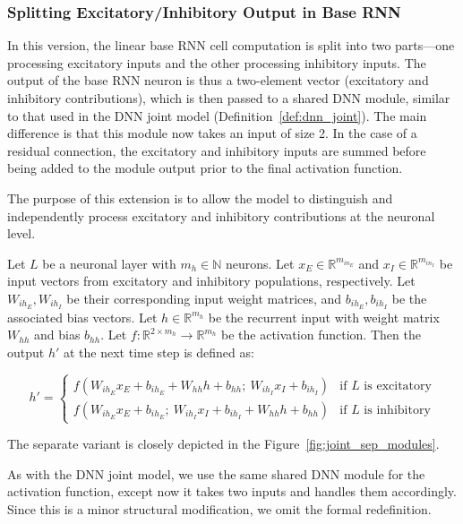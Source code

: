\subsubsection{Splitting Excitatory/Inhibitory Output in Base RNN}
\label{subsubsec:dnn_separate}
In this version, the linear base RNN cell computation is split into two parts—one processing excitatory inputs and the other processing inhibitory inputs. The output of the base RNN neuron is thus a two-element vector (excitatory and inhibitory contributions), which is then passed to a shared DNN module, similar to that used in the DNN joint model (Definition~\ref{def:dnn_joint}). The main difference is that this module now takes an input of size 2. In the case of a residual connection, the excitatory and inhibitory inputs are summed before being added to the module output prior to the final activation function.

The purpose of this extension is to allow the model to distinguish and independently process excitatory and inhibitory contributions at the neuronal level.

\begin{defn}
Let $L$ be a neuronal layer with $m_h \in \mathbb{N}$ neurons. Let $x_E \in \mathbb{R}^{m_{in_E}}$ and $x_I \in \mathbb{R}^{m_{in_I}}$ be input vectors from excitatory and inhibitory populations, respectively. Let $W_{ih_E}, W_{ih_I}$ be their corresponding input weight matrices, and $b_{ih_E}, b_{ih_I}$ be the associated bias vectors. Let $h \in \mathbb{R}^{m_h}$ be the recurrent input with weight matrix $W_{hh}$ and bias $b_{hh}$. Let $f: \mathbb{R}^{2 \times m_h} \to \mathbb{R}^{m_h}$ be the activation function. Then the output $h'$ at the next time step is defined as:

\begin{equation*}
    h' = 
    \begin{cases}
        f\left(W_{ih_E}x_E + b_{ih_E} + W_{hh}h + b_{hh};\ W_{ih_I}x_I + b_{ih_I}\right) & \text{if $L$ is excitatory} \\
        f\left(W_{ih_E}x_E + b_{ih_E};\ W_{ih_I}x_I + b_{ih_I} + W_{hh}h + b_{hh}\right) & \text{if $L$ is inhibitory}
    \end{cases}
\end{equation*}
\end{defn}
\label{def:separate_base_rnn}

The separate variant is closely depicted in the Figure~\ref{fig:joint_sep_modules}.

As with the DNN joint model, we use the same shared DNN module for the activation function, except now it takes two inputs and handles them accordingly. Since this is a minor structural modification, we omit the formal redefinition.

